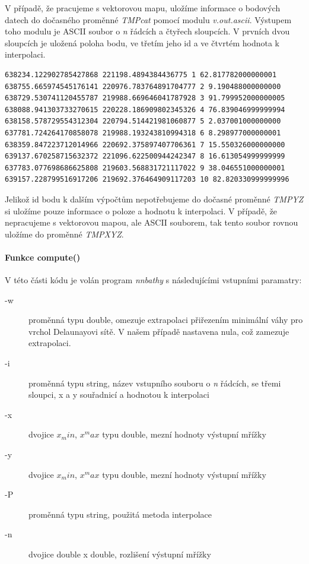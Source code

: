 \documentclass[12pt,a4paper]{article}
\begin{document}
V případě, že pracujeme s vektorovou mapu, uložíme informace o bodových datech do dočasného proměnné \textit{TMPcat} pomocí modulu \textit{v.out.ascii}. Výstupem toho modulu je ASCII soubor o \textit{n} řádcích a čtyřech sloupcích. V prvních dvou sloupcích je uložená poloha bodu, ve třetím jeho id a ve čtvrtém hodnota k interpolaci. 

\begin{lstlisting}
638234.122902785427868 221198.4894384436775 1 62.817782000000001
638755.665974545176141 220976.783764891704777 2 9.190488000000000
638729.530741120455787 219988.669646041787928 3 91.799952000000005
638088.941303733270615 220228.186909802345326 4 76.839046999999994
638158.578729554312304 220794.514421981060877 5 2.037001000000000
637781.724264170858078 219988.193243810994318 6 8.298977000000001
638359.847223712014966 220692.375897407706361 7 15.550326000000000
639137.670258715632372 221096.622500944242347 8 16.613054999999999
637783.077698686625808 219603.568831721117022 9 38.046551000000001
639157.228799516917206 219692.376464909117203 10 82.820330999999996
\end{lstlisting}

Jelikož id bodu k dalším výpočtům nepotřebujeme do dočasné proměnné \textit{TMPYZ} si uložíme pouze informace o poloze a hodnotu k interpolaci. V případě, že nepracujeme s vektorovou mapou, ale ASCII souborem, tak tento soubor rovnou uložíme do proměnné \textit{TMPXYZ}.



\paragraph{Funkce compute()}
V této části kódu je volán program \textit{nnbathy} s následujícími vstupními paramatry:
\begin{description}
\item[-w]{proměnná typu double, omezuje extrapolaci přiřezením minimální váhy pro vrchol Delaunayovi sítě. V našem případě nastavena nula, což zamezuje extrapolaci.}
\item[-i]{proměnná typu string, název vstupního souboru o \textit{n} řádcích, se třemi sloupci, x a y souřadnicí a hodnotou k interpolaci}
\item[-x]{dvojice $x_min$, $x^max$ typu double, mezní hodnoty výstupní mřížky}
\item[-y]{dvojice $x_min$, $x^max$ typu double, mezní hodnoty výstupní mřížky}
\item[-P]{proměnná typu string, použitá metoda interpolace}
\item[-n]{dvojice double x double, rozlišení výstupní mřížky}
\end{description}
\end{document}
